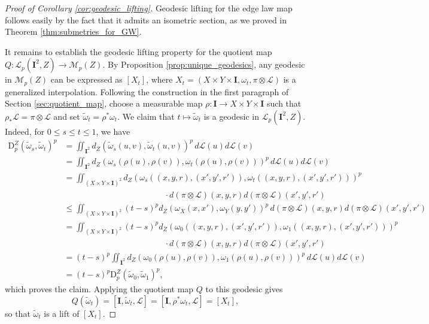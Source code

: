 \documentclass{article}
\theoremstyle{definition}
\newcommand{\M}{\mathcal{M}}
\newcommand{\MZp}{\M_p(Z)}
\newcommand{\Lp}{\mathcal{L}_p}
\newcommand{\dpz}{\mathrm{D}^Z_p}
\begin{document}
\begin{proof}[Proof of Corollary \ref{cor:geodesic_lifting}]
    Geodesic lifting for the edge law map follows easily by the fact that it admits an isometric section, as we proved in Theorem \ref{thm:submetries_for_GW}. 
    
    It remains to establish the geodesic lifting property for the quotient map $Q:\Lp(\mathbf{I}^2,Z) \to \MZp$. By Proposition \ref{prop:unique_geodesics}, any geodesic in $\MZp$ can be expressed as $[X_t]$, where $X_t = (X \times Y \times \mathbf{I}, \omega_t, \pi \otimes \mathscr{L})$ is a generalized interpolation. Following the construction in the first paragraph of Section \ref{sec:quotient_map}, choose a measurable map $\rho:\mathbf{I} \to X \times Y \times \mathbf{I}$ such that $\rho_\ast \mathscr{L} = \pi \otimes \mathscr{L}$ and set $\widetilde{\omega}_t = \rho^\ast \omega_t$. We claim that $t \mapsto \widetilde{\omega}_t$ is a geodesic in $\Lp(\mathbf{I}^2,Z)$. Indeed, for $0 \leq s \leq t \leq 1$, we have 
    \begin{align*}
        \dpz(\widetilde{\omega}_s,\widetilde{\omega}_t)^p &= \iint_{\mathbf{I}^2} d_Z\left(\widetilde{\omega}_s(u,v),\widetilde{\omega}_t(u,v)\right)^p \, d\mathscr{L}(u) d \mathscr{L}(v) \\
        &= \iint_{\mathbf{I}^2} d_Z(\omega_s(\rho(u),\rho(v)),\omega_t(\rho(u),\rho(v)))^p \, d\mathscr{L}(u) d \mathscr{L}(v) \\
        &= \iint_{(X \times Y \times \mathbf{I})^2} d_Z\left(\omega_s((x,y,r),(x',y',r')),\omega_t((x,y,r),(x',y',r'))\right)^p 
        \\
        &\hspace{2in} \cdot d(\pi \otimes \mathscr{L})(x,y,r) d (\pi \otimes \mathscr{L})(x',y',r') \\
        &\leq \iint_{(X \times Y \times \mathbf{I})^2} (t-s)^p d_Z(\omega_X(x,x'),\omega_Y(y,y'))^p \, d(\pi \otimes \mathscr{L})(x,y,r) d (\pi \otimes \mathscr{L})(x',y',r') \\
        &= \iint_{(X \times Y \times \mathbf{I})^2} (t-s)^p d_Z\left(\omega_0((x,y,r),(x',y',r')),\omega_1((x,y,r),(x',y',r'))\right)^p 
        \\
        &\hspace{2in} \cdot d(\pi \otimes \mathscr{L})(x,y,r) d (\pi \otimes \mathscr{L})(x',y',r') \\
        &= (t-s)^p \iint_{\mathbf{I}^2} d_Z(\omega_0(\rho(u),\rho(v)),\omega_1(\rho(u),\rho(v)))^p \, d\mathscr{L}(u) d \mathscr{L}(v) \\
        &= (t-s)^p \dpz(\widetilde{\omega}_0,\widetilde{\omega}_1)^p,
    \end{align*}
    which proves the claim. Applying the quotient map $Q$ to this geodesic gives 
    \[
    Q(\widetilde{\omega}_t) = [\mathbf{I},\widetilde{\omega}_t,\mathscr{L}] = [\mathbf{I}, \rho^\ast \omega_t, \mathscr{L}] = [X_t],
    \]
    so that $\widetilde{\omega}_t$ is a lift of $[X_t]$. 
\end{proof}
\end{document}
